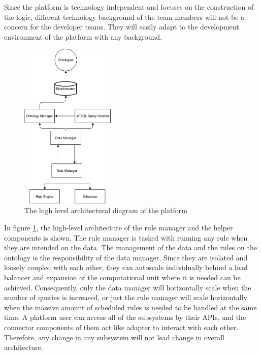Since the platform is technology independent and focuses on the construction of the logic, different technology background of the team members will not be a concern for the developer teams. They will easily adapt to the development environment of the platform with any background.
\clearpage
\begin{figure}[h]
  \centering
  \includegraphics[width=0.4\textwidth,height=\textheight,keepaspectratio]{figures/high_level_architectural_diagram.pdf}
  \caption[Platform Architecture]{The high level architectural diagram of the platform}\label{fig:architecture}
\end{figure}

In figure \ref{fig:architecture}, the high-level architecture of the rule manager and the helper components is shown. The rule manager is tasked with running any rule when they are intended on the data. The management of the data and the rules on the ontology is the responsibility of the data manager. Since they are isolated and loosely coupled with each other, they can autoscale individually behind a load balancer and expansion of the computational unit where it is needed can be achieved. Consequently, only the data manager will horizontally scale when the number of queries is increased, or just the rule manager will scale horizontally when the massive amount of scheduled rules is needed to be handled at the same time. A platform user can access all of the subsystems by their APIs, and the connector components of them act like adapter to interact with each other. Therefore, any change in any subsystem will not lead change in overall architecture.
